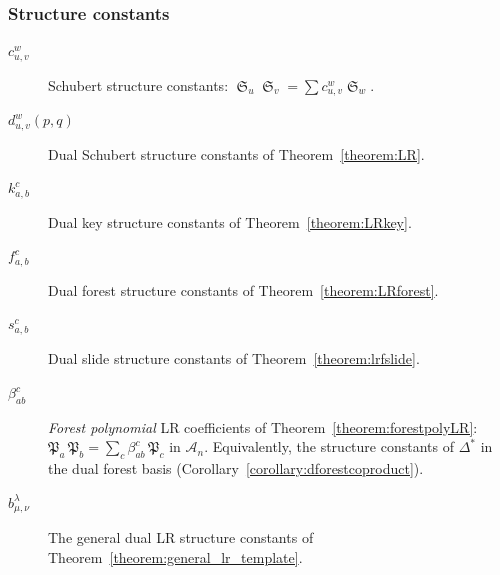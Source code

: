 \documentclass{amsart}
\theoremstyle{definition}
\theoremstyle{remark}
\numberwithin{equation}{subsection}
\DeclareMathOperator{\sch}{\mathfrak{S}}
\newcommand{\coma}{\mathcal{A}}
\newcommand{\forest}{\mathfrak{P}}
\begin{document}
\subsubsection*{Structure constants}
\begin{description}
\item[$c_{u,v}^w$] Schubert structure constants: $\sch_u\sch_v=\sum c_{u,v}^w\sch_w$.
\item[$d_{u,v}^w(p,q)$] Dual Schubert structure constants of Theorem~\ref{theorem:LR}.
\item[$k_{a,b}^c$] Dual key structure constants of Theorem~\ref{theorem:LRkey}.
\item[$f_{a,b}^c$] Dual forest structure constants of Theorem~\ref{theorem:LRforest}.
\item[$s_{a,b}^c$] Dual slide structure constants of Theorem~\ref{theorem:lrfslide}.
\item[$\beta_{ab}^c$] \emph{Forest polynomial} LR coefficients of Theorem~\ref{theorem:forestpolyLR}: $\forest_a\,\forest_b=\sum_c\beta_{ab}^c\,\forest_c$ in $\coma_n$. Equivalently, the structure constants of $\Delta^*$ in the dual forest basis (Corollary~\ref{corollary:dforestcoproduct}).
\item[$b_{\mu,\nu}^\lambda$] The general dual LR structure constants of Theorem~\ref{theorem:general_lr_template}.
\end{description}
\end{document}
